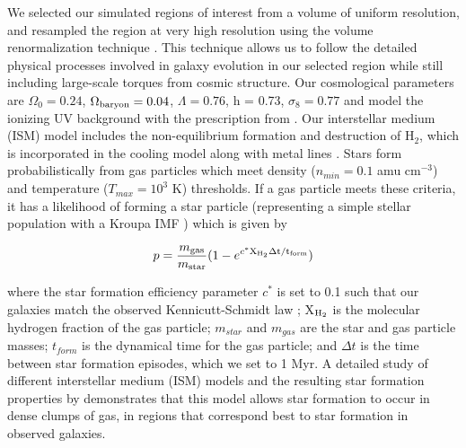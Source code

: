 \documentclass[nofootinbib,twocolumn,prd]{emulateapj}
\begin{document}
We selected our simulated regions of interest from a volume of
uniform resolution, and resampled the region at very high
resolution using the volume renormalization technique \citep{Katz93}.
This technique allows us to follow the detailed physical processes
involved in galaxy evolution in our selected region while still
including large-scale torques from cosmic structure.  Our cosmological parameters are $\Omega_0 = 0.24$, $\Omega_{\rm baryon} = 0.04$, $\Lambda = 0.76$, h = 0.73, $\sigma_8 = 0.77$ 
 \citep{WMAP3} and model the ionizing UV background
with the prescription from \citet{Haardt96}.  Our interstellar medium (ISM) model includes the non-equilibrium formation and destruction of H$_2$, which is incorporated in the cooling model along with metal lines \citep{Christensen12}.  Stars form
probabilistically from gas particles which meet density ($n_{min} =
0.1$ amu cm$^{-3}$) and temperature ($T_{max} = 10^3$ K) thresholds. If a gas
particle meets these criteria, it has a likelihood of forming a star
particle (representing a simple stellar population with a Kroupa IMF
\citep{Kroupa}) which is given by

\begin{equation}
p = \frac{m_{\rm gas}}{m_{\rm star}} (1 - e^{c^*\rm X_{\rm H_2} \Delta t/t_{\rm form}})
\end{equation}

\noindent
where the star formation efficiency parameter $c^*$ is set to 0.1 such
that our galaxies match the observed Kennicutt-Schmidt law
\citep{Kennicutt89};  X$_{\rm H_2}$ is the molecular hydrogen fraction of the gas particle; $m_{star}$ and $m_{gas}$ are the star and gas
particle masses; %
 $t_{form}$ is the dynamical time for the gas
particle; and $\Delta t$ is the time between star formation episodes,
which we set to 1 Myr.  A detailed study of different interstellar medium (ISM) models and the resulting star formation properties by \citet{Christensen14a} demonstrates that this model allows star formation to occur in dense clumps of gas, in regions that correspond best to star formation in observed galaxies.  
\end{document}
